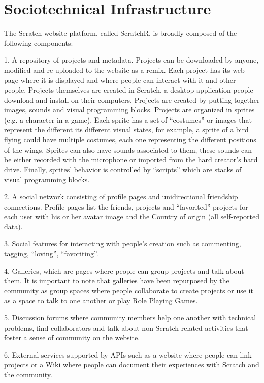 \section{Sociotechnical Infrastructure}
The Scratch website platform, called ScratchR, is broadly composed of the following components: 

1. A repository of projects and metadata. Projects can be downloaded by anyone, modified and re-uploaded to the website as a remix. Each project has its web page where it is displayed and where people can interact with it and other people. Projects themselves are created in Scratch, a desktop application people download and install on their computers. Projects are created by putting together images, sounds and visual programming blocks. Projects are organized in sprites (e.g. a character in a game). Each sprite has a set of ``costumes'' or images that represent the different its different visual states, for example, a sprite of a bird flying could have multiple costumes, each one representing the different positions of the wings. Sprites can also have sounds associated to them, these sounds can be either recorded with the microphone or imported from the hard creator's hard drive. Finally, sprites' behavior is controlled by ``scripts'' which are stacks of visual programming blocks. 

2. A social network consisting of profile pages and unidirectional friendship connections. Profile pages list the friends, projects and ``favorited'' projects for each user with his or her avatar image and the Country of origin (all self-reported data).

3. Social features for interacting with people's creation such as commenting, tagging, ``loving'', ``favoriting''.

4. Galleries, which are pages where people can group projects and talk about them. It is important to note that galleries have been repurposed by the community as group spaces where people collaborate to create projects or use it as a space to talk to one another or play Role Playing Games.

5. Discussion forums where community members help one another with technical problems, find collaborators and talk about non-Scratch related activities that foster a sense of community on the website.

6. External services supported by APIs such as a website where people can link projects or a Wiki where people can document their experiences with Scratch and the community.

